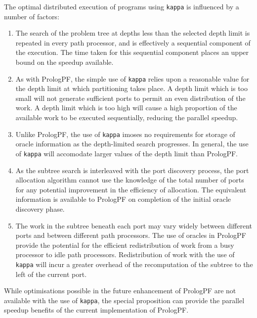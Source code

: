 The optimal distributed execution of programs using \texttt{kappa}
is influenced by a number of factors:
\begin{enumerate}
\item{The search of the problem tree at depths less than the selected depth limit is
  repeated in every path processor, and is effectively a sequential component of
  the execution.  The time taken for this sequential component places an upper bound
  on the speedup available.}
\item{As with PrologPF, the simple use of \texttt{kappa} relies upon a reasonable value
  for the depth limit at which partitioning takes place.  A depth limit which is too
  small will not generate sufficient ports to permit an even distribution of the work.
  A depth limit which is too high will cause a high proportion of the available work to
  be executed sequentially, reducing the parallel speedup.}
\item{Unlike PrologPF, the use of \texttt{kappa} imoses no requirements for storage of
  oracle information as the depth-limited search progresses.  In general, the use of
  \texttt{kappa} will accomodate larger values of the depth limit than PrologPF.}
\item{As the subtree search is interleaved with the port discovery process, the port
  allocation algorithm cannot use the knowledge of the total number of ports for any
  potential improvement in the efficiency of allocation.  The equivalent information is
  available to PrologPF on completion of the initial oracle discovery phase.}
\item{The work in the subtree beneath each port may vary widely between different ports
  and between different path processors.
  The use of oracles in PrologPF provide the potential for the
  efficient redistribution of work from a busy processor to idle path processors.
  Redistribution of work with the use of \texttt{kappa} will incur a greater overhead of
  the recomputation of the subtree to the left of the current port.}
\end{enumerate}

While optimisations possible in the future enhancement of PrologPF are not available
with the use of \texttt{kappa},  the special proposition can provide the parallel speedup
benefits of the current implementation of PrologPF.